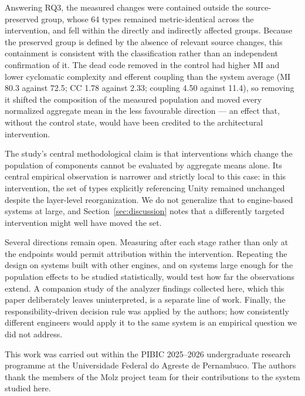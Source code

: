 \documentclass{sbc2019}%
\begin{document}
Answering RQ3, the measured changes were contained outside the source-preserved
group, whose 64 types remained metric-identical across the intervention, and fell
within the directly and indirectly affected groups. Because the preserved group is
defined by the absence of relevant source changes, this containment is consistent
with the classification rather than an independent confirmation of it. The dead
code removed in the control had higher MI and lower cyclomatic complexity and
efferent coupling than the system average (MI 80.3 against 72.5; CC 1.78 against
2.33; coupling 4.50 against 11.4), so removing it shifted the composition of the
measured population
and moved every normalized aggregate mean in the less favourable direction --- an
effect that, without the control state, would have been credited to the
architectural intervention.

The study's central methodological claim is that interventions which change the
population of components cannot be evaluated by aggregate means alone. Its
central empirical observation is narrower and strictly local to this case: in
this intervention, the set of types explicitly referencing Unity remained
unchanged despite the layer-level reorganization. We do not generalize that to
engine-based systems at large, and Section~\ref{sec:discussion} notes that a
differently targeted intervention might well have moved the set.

Several directions remain open. Measuring after each stage rather than only at
the endpoints would permit attribution within the intervention. Repeating the
design on systems built with other engines, and on systems large enough for the
population effects to be studied statistically, would test how far the
observations extend. A companion study of the analyzer findings collected here,
which this paper deliberately leaves uninterpreted, is a separate line of work.
Finally, the responsibility-driven decision rule was applied by the authors; how
consistently different engineers would apply it to the same system is an
empirical question we did not address.

\FloatBarrier

\begin{acknowledgements}
This work was carried out within the PIBIC 2025--2026 undergraduate research
programme at the Universidade Federal do Agreste de Pernambuco. The authors
thank the members of the Molz project team for their contributions to the
system studied here.
\end{acknowledgements}
\end{document}
